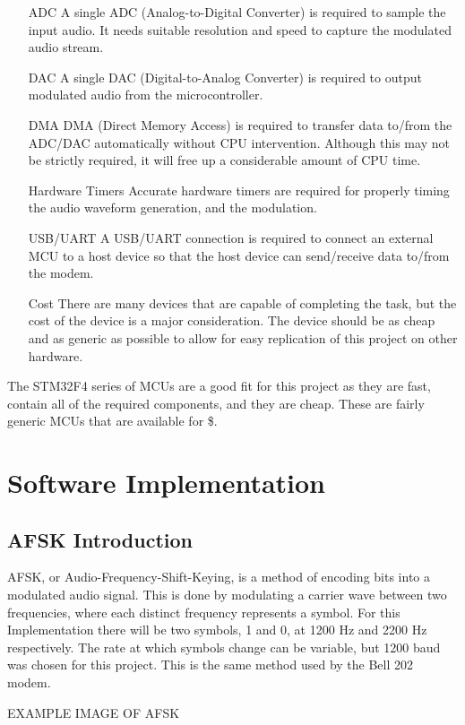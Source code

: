 \documentclass{journal}
\begin{document}
\begin{itemize}
  \item[ADC] A single ADC (Analog-to-Digital Converter) is required to sample the input audio. It needs suitable resolution and speed to capture the modulated audio stream.
  \item[DAC] A single DAC (Digital-to-Analog Converter) is required to output modulated audio from the microcontroller.
  \item[DMA] DMA (Direct Memory Access) is required to transfer data to/from the ADC/DAC automatically without CPU intervention. Although this may not be strictly required, it will free up a considerable amount of CPU time.
  \item[Hardware Timers] Accurate hardware timers are required for properly timing the audio waveform generation, and the modulation.
  \item[USB/UART] A USB/UART connection is required to connect an external MCU to a host device so that the host device can send/receive data to/from the modem.
  \item[Cost] There are many devices that are capable of completing the task, but the cost of the device is a major consideration. The device should be as cheap and as generic as possible to allow for easy replication of this project on other hardware.
\end{itemize}

The STM32F4 series of MCUs are a good fit for this project as they are fast, contain all of the required components, and they are cheap. These are fairly generic MCUs that are available for \$.

\section{Software Implementation}
\subsection{AFSK Introduction}
AFSK, or Audio-Frequency-Shift-Keying, is a method of encoding bits into a modulated audio signal. This is done by modulating a carrier wave between two frequencies, where each distinct frequency represents a symbol. For this Implementation there will be two symbols, 1 and 0, at 1200 Hz and 2200 Hz respectively. The rate at which symbols change can be variable, but 1200 baud was chosen for this project. This is the same method used by the Bell 202 modem.

EXAMPLE IMAGE OF AFSK
\end{document}
